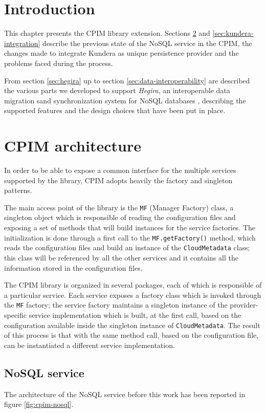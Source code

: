 \section{Introduction}
This chapter presents the CPIM library extension. Sections \ref{sec:cpim-architecture} and \ref{sec:kundera-integration} describe the previous state of the NoSQL service in the CPIM, the changes made to integrate Kundera as unique persistence provider and the problems faced during the process.

\noindent From section \ref{sec:hegira} up to section \ref{sec:data-interoperability} are described the various parts we developed to support \textit{Hegira}, an interoperable data migration sand synchronization system for NoSQL databases \cite{paper:modaclouds-deliverable}, describing the supported features and the design choices that have been put in place. 

\section{CPIM architecture}
\label{sec:cpim-architecture}
In order to be able to expose a common interface for the multiple services supported by the library, CPIM adopts heavily the factory and singleton patterns.

\noindent The main access point of the library is the \texttt{MF} (Manager Factory) class, a singleton object which is responsible of reading the configuration files and exposing a set of methods that will build instances for the service factories.
The initialization is done through a first call to the \texttt{MF.getFactory()} method, which reads the configuration files and build an instance of the \texttt{CloudMetadata} class; this class will be referenced by all the other services and it contains all the information stored in the configuration files.
 
\newparagraph The CPIM library is organized in several packages, each of which is responsible of a particular service.
\noindent Each service exposes a factory class which is invoked through the \texttt{MF} factory; the service factory maintains a singleton instance of the provider-specific service implementation which is built, at the first call, based on the configuration available inside the singleton instance of \texttt{CloudMetadata}.
The result of this process is that with the same method call, based on the configuration file, can be instantiated a different service implementation.

\subsection{NoSQL service}
The architecture of the NoSQL service before this work has been reported in figure \ref{fig:cpim-nosql}.

